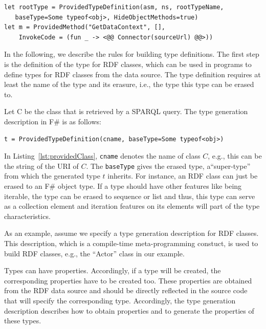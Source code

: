 \documentclass{llncs} %
\newcommand{\fs}{\textsf{F\#}\xspace}
\begin{document}
\begin{lstlisting}[style=code, caption={\textbf{Basic Rule:} For the generation of a root type with data handler}, label={lst:root}]
let rootType = ProvidedTypeDefinition(asm, ns, rootTypeName,
   baseType=Some typeof<obj>, HideObjectMethods=true)
let m = ProvidedMethod("GetDataContext", [], 
    InvokeCode = (fun _ -> <@@ Connector(sourceUrl) @@>))       
\end{lstlisting}

In the following, we describe the rules for building type definitions.
The first step is the definition of the type for RDF classes, which can be used in programs
to define types for RDF classes from the data source.
The type definition requires at least the name of the type and its erasure, i.e., the type this type can be erased to.

Let C be the class that is retrieved by a SPARQL query. The type generation description in \fs
is as follows:

\begin{lstlisting}[style=code, caption={\textbf{Type Rule:} Type Generation Description for RDF Class C}, label={lst:providedClass}]
t = ProvidedTypeDefinition(cname, baseType=Some typeof<obj>)
\end{lstlisting}

In Listing~\ref{lst:providedClass}, \texttt{cname} denotes the name of class $C$, e.g., this can be the string of the URI of $C$.
The \texttt{baseType} gives the erased type, a``super-type'' from which the generated type $t$ inherits.
For instance, an RDF class can just be erased to an \fs object type. If a type should have other features
like being iterable, the type can be erased to sequence or list and thus, this type can serve as a collection
element and iteration features on its elements will part of the type characteristics.

As an example, assume we specify a type generation description for RDF classes.
This description, which is a compile-time meta-programming constuct, is
used to build RDF classes, e.g., the ``Actor'' class in our example.


Types can have properties. Accordingly, if a type will be created, the corresponding properties
have to be created too. These properties are obtained from the RDF data source and should
be directly reflected in the source code that will specify the corresponding type.
Accordingly, the type generation description describes how to obtain properties and to
generate the properties of these types.
\end{document}

